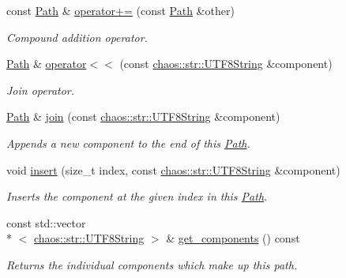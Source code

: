 \begin{DoxyCompactItemize}
const \hyperlink{classchaos_1_1io_1_1file_1_1_path}{Path} \& \hyperlink{classchaos_1_1io_1_1file_1_1_path_a6b89728f3dc58d20f21d3d5b6557ae2b}{operator+=} (const \hyperlink{classchaos_1_1io_1_1file_1_1_path}{Path} \&other)
\begin{DoxyCompactList}\small\item\em Compound addition operator. \end{DoxyCompactList}\item 
\hyperlink{classchaos_1_1io_1_1file_1_1_path}{Path} \& \hyperlink{classchaos_1_1io_1_1file_1_1_path_ac387ee9adf8455686998c392eebae4a8}{operator$<$$<$} (const \hyperlink{classchaos_1_1str_1_1_u_t_f8_string}{chaos\-::str\-::\-U\-T\-F8\-String} \&component)
\begin{DoxyCompactList}\small\item\em Join operator. \end{DoxyCompactList}\item 
\hyperlink{classchaos_1_1io_1_1file_1_1_path}{Path} \& \hyperlink{classchaos_1_1io_1_1file_1_1_path_a94c5bfc90cdbf2096962f1bf03c9be7c}{join} (const \hyperlink{classchaos_1_1str_1_1_u_t_f8_string}{chaos\-::str\-::\-U\-T\-F8\-String} \&component)
\begin{DoxyCompactList}\small\item\em Appends a new component to the end of this \hyperlink{classchaos_1_1io_1_1file_1_1_path}{Path}. \end{DoxyCompactList}\item 
void \hyperlink{classchaos_1_1io_1_1file_1_1_path_a974a945f9c1971eddf672717ea32ac3d}{insert} (size\-\_\-t index, const \hyperlink{classchaos_1_1str_1_1_u_t_f8_string}{chaos\-::str\-::\-U\-T\-F8\-String} \&component)
\begin{DoxyCompactList}\small\item\em Inserts the component at the given index in this \hyperlink{classchaos_1_1io_1_1file_1_1_path}{Path}. \end{DoxyCompactList}\item 
const std\-::vector\\*
$<$ \hyperlink{classchaos_1_1str_1_1_u_t_f8_string}{chaos\-::str\-::\-U\-T\-F8\-String} $>$ \& \hyperlink{classchaos_1_1io_1_1file_1_1_path_a2cf2f806bd7e8969c6cd215271c0e104}{get\-\_\-components} () const 
\begin{DoxyCompactList}\small\item\em Returns the individual components which make up this path. \end{DoxyCompactList}\end{DoxyCompactItemize}


